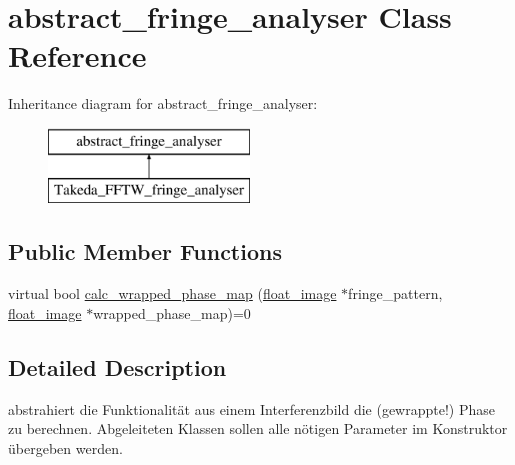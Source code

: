 \hypertarget{classabstract__fringe__analyser}{\section{abstract\-\_\-fringe\-\_\-analyser Class Reference}
\label{classabstract__fringe__analyser}
}
Inheritance diagram for abstract\-\_\-fringe\-\_\-analyser\-:\begin{figure}[H]
\begin{center}
\leavevmode
\includegraphics[height=2.000000cm]{classabstract__fringe__analyser}
\end{center}
\end{figure}
\subsection*{Public Member Functions}
\begin{DoxyCompactItemize}
\item 
virtual bool \hyperlink{classabstract__fringe__analyser_a48f796b6b3d8dbf9dd66f5e5eaf98153}{calc\-\_\-wrapped\-\_\-phase\-\_\-map} (\hyperlink{classfloat__image}{float\-\_\-image} $\ast$fringe\-\_\-pattern, \hyperlink{classfloat__image}{float\-\_\-image} $\ast$wrapped\-\_\-phase\-\_\-map)=0
\end{DoxyCompactItemize}


\subsection{Detailed Description}
abstrahiert die Funktionalität aus einem Interferenzbild die (gewrappte!) Phase zu berechnen. Abgeleiteten Klassen sollen alle nötigen Parameter im Konstruktor übergeben werden. 

